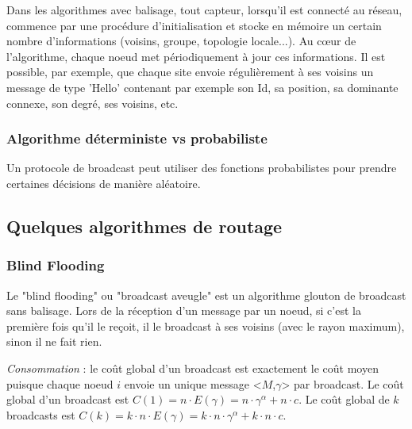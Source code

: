 Dans les algorithmes avec balisage, tout capteur, lorsqu'il est connecté au réseau, commence par une procédure d'initialisation et stocke en mémoire un certain nombre d'informations (voisins, groupe, topologie locale...). Au cœur de l'algorithme, chaque noeud met périodiquement à jour ces informations. Il est possible, par exemple, que chaque site envoie régulièrement à ses voisins un message de type
'Hello' contenant par exemple son Id, sa position, sa dominante connexe, son degré, ses voisins, etc.



\subsubsection{Algorithme déterministe vs probabiliste}
Un protocole de broadcast peut utiliser des fonctions probabilistes pour prendre certaines décisions de manière aléatoire.



\subsection{Quelques algorithmes de routage}



\subsubsection{Blind Flooding}
Le "blind flooding" ou "broadcast aveugle" est un algorithme glouton de broadcast sans balisage. Lors de la réception d'un message par un noeud, si c'est la première fois qu'il le reçoit, il le broadcast à ses voisins (avec le rayon maximum), sinon il ne fait rien.

\emph{Consommation} :  le coût global d'un broadcast est exactement le coût moyen puisque chaque noeud $i$ envoie un unique message <$M$,$\gamma$> par broadcast.
Le coût global d'un broadcast est $C(1) = n \cdot E( \gamma )= n\cdot \gamma^\alpha +  n\cdot c $.
Le coût global de $k$ broadcasts est $C(k) = k\cdot n \cdot E( \gamma )= k\cdot n \cdot \gamma^\alpha +  k \cdot n\cdot c $.

